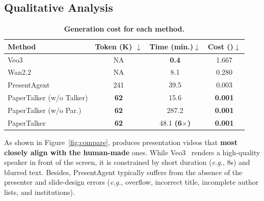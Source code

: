 \subsection{Qualitative Analysis}
\vspace{-0.4\baselineskip} 
\begin{table}
  \vspace{-1.8\baselineskip} 
  \centering
  \tablesize
  \caption{\textbf{Generation cost for each method.}}
  {
  \setlength{\tabcolsep}{3pt}
  \begin{tabular}{lccc}
    \toprule
    Method & Token (K) $\downarrow$ & Time (min.)$\downarrow$ & Cost (\text{\$})$\downarrow$ \\
    \midrule
    Veo3~\cite{deepmind2025veo3} & NA & \textbf{0.4} & 1.667 \\
    Wan2.2~\cite{wan} & NA & 8.1 & 0.280 \\
    \hline
    PresentAgent~\cite{shi2025presentagent} & 241 & 39.5 & 0.003  \\
    PaperTalker (w/o Talker) &  \textbf{62} & 15.6 & \textbf{0.001}\\    
    PaperTalker (w/o Par.) & \textbf{62} & 287.2 & \textbf{0.001}\\
    PaperTalker & \textbf{62} & 48.1 \textbf{(6$\times$)} & \textbf{0.001} \\
    \bottomrule
  \end{tabular}
  }
  \label{table:cost}
  \vspace{-2\baselineskip} 
\end{table}
As shown in Figure~\ref{fig:compare}, {\agent} produces presentation videos that \textbf{most closely align with the human-made} ones. While Veo3~\cite{deepmind2025veo3} renders a high-quality speaker in front of the screen, it is constrained by short duration (\textit{e.g.}, 8s) and blurred text. Besides, PresentAgent\cite{shi2025presentagent} typically suffers from the absence of the presenter and slide-design errors (\textit{e.g.}, overflow, incorrect title, incomplete author lists, and institutions).











\vspace{-0.4\baselineskip} 
